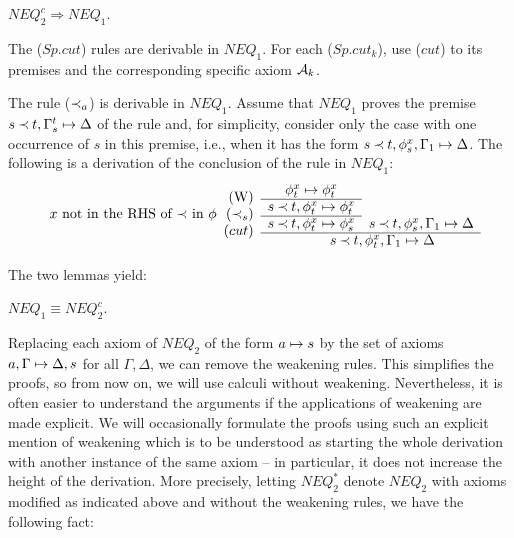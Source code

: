 \begin{LEMMA} $NEQ_2^c \Rightarrow NEQ_1$.\end{LEMMA}
\begin{PROOF}
\begin{LS}
\item The ($Sp.cut$) rules  are derivable in $NEQ_1$.
For each ($Sp.cut_k$), use ($cut$) to its premises and the 
corresponding specific axiom ${\cal {A}}_k$.
\item  The rule  ($\mathbin{\prec}_a$) is derivable in $NEQ_1$.
Assume that $NEQ_1$ proves the premise 
$s\mathbin{\prec} t,\Gamma^t_s\mathrel{\mapsto}\Delta$ of the rule and, for simplicity, 
consider only the case with one occurrence of $s$ in this premise, i.e., when
it has the form $s\mathbin{\prec} t, \phi_s^x,\Gamma_1\mathrel{\mapsto}\Delta$. 
The following is a derivation of
the conclusion of the rule in $NEQ_1$:
\[ \begin{array}{rcc}
\raisebox{-1.2ex}[1.5ex][0ex]{(W)} & \phi_t^x\Seq \phi_t^x &  \\ \cline{2-2}
\raisebox{-1.2ex}[1.5ex][0ex]{
$x$ not in the RHS of $\Incl$ in $\phi$\ \ ($\Incl_s$)} 
 & s\Incl t,\phi_t^x\Seq \phi_t^x & 
      \\ \cline{2-2}
 \raisebox{-1.2ex}[1.5ex][0ex]{($cut$)} 
& s\Incl t, \phi_t^x \Seq \phi_s^x & s\Incl t, \phi_s^x, \Gamma_1\Seq\Delta 
   \\ \cline{2-3}
& \multicolumn{2}{c}{\ \ \ \ \ s\Incl t,\phi_t^x,\Gamma_1\Seq\Delta}
\end{array} \]
\end{LS}
\end{PROOF}
\noindent
The two lemmas yield:
\begin{LEMMA}\label{le:neq1isneq2} $NEQ_1 \equiv NEQ_2^c$.\end{LEMMA}
\noindent
Replacing each axiom of $NEQ_2$ of the form $a\mathrel{\mapsto} s$ by
the set of axioms $a, \Gamma\mathrel{\mapsto}\Delta, s$ for all $\Gamma, \Delta$, we can
remove the weakening rules. This simplifies the proofs, so from now on, we will use 
calculi without weakening. Nevertheless, it is often easier to understand the arguments if
the applications of weakening are made explicit. We will occasionally
formulate the proofs using such an explicit mention of weakening which is to
be understood as starting the whole derivation with another instance of the
same axiom -- in particular, it does not increase the height of the
derivation. More precisely, letting $NEQ_2^*$ denote $NEQ_2$ with axioms 
modified as indicated above and without the weakening rules, we have the following fact:

